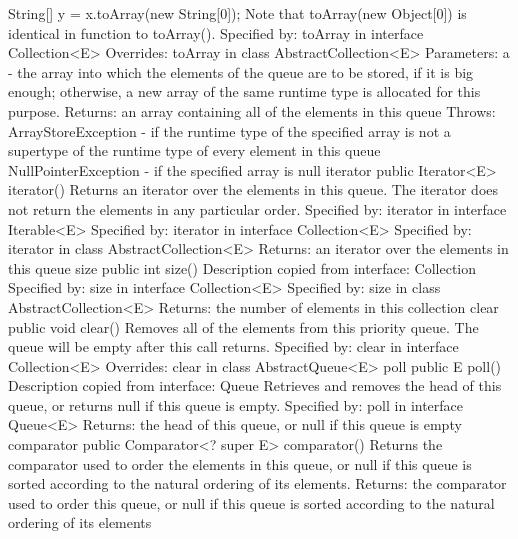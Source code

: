 \documentclass[babel]{book}
\begin{document}
String[] y = x.toArray(new String[0]);
Note that toArray(new Object[0]) is identical in function to toArray().
Specified by:
toArray in interface Collection<E>
Overrides:
toArray in class AbstractCollection<E>
Parameters:
a - the array into which the elements of the queue are to be stored, if it is big enough; otherwise, a new array of the same runtime type is allocated for this purpose.
Returns:
an array containing all of the elements in this queue
Throws:
ArrayStoreException - if the runtime type of the specified array is not a supertype of the runtime type of every element in this queue
NullPointerException - if the specified array is null
iterator
public Iterator<E> iterator()
Returns an iterator over the elements in this queue. The iterator does not return the elements in any particular order.
Specified by:
iterator in interface Iterable<E>
Specified by:
iterator in interface Collection<E>
Specified by:
iterator in class AbstractCollection<E>
Returns:
an iterator over the elements in this queue
size
public int size()
Description copied from interface: Collection
Specified by:
size in interface Collection<E>
Specified by:
size in class AbstractCollection<E>
Returns:
the number of elements in this collection
clear
public void clear()
Removes all of the elements from this priority queue. The queue will be empty after this call returns.
Specified by:
clear in interface Collection<E>
Overrides:
clear in class AbstractQueue<E>
poll
public E poll()
Description copied from interface: Queue
Retrieves and removes the head of this queue, or returns null if this queue is empty.
Specified by:
poll in interface Queue<E>
Returns:
the head of this queue, or null if this queue is empty
comparator
public Comparator<? super E> comparator()
Returns the comparator used to order the elements in this queue, or null if this queue is sorted according to the natural ordering of its elements.
Returns:
the comparator used to order this queue, or null if this queue is sorted according to the natural ordering of its elements
\end{document}
